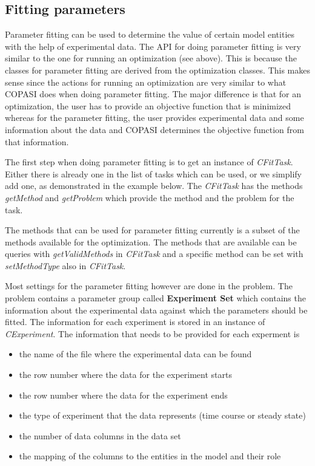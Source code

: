 \documentclass[a4,10pt]{article}
\begin{document}
\subsection{Fitting parameters}
\label{ParameterFitting}

Parameter fitting can be used to determine the value of certain model entities with the help of experimental data.
The API for doing parameter fitting is very similar to the one for running an optimization (see above). This is because the classes for parameter fitting are derived from the optimization classes.
This makes sense since the actions for running an optimization are very similar to what COPASI does when doing parameter fitting. The major difference is that for an optimization, the user has to provide an objective function that is minimized whereas for the parameter fitting, the user provides experimental data and some information about the data and COPASI determines the objective function from that information.

The first step when doing parameter fitting is to get an instance of \textit{CFitTask}. Either there is already one in the list of tasks which can be used, or we simplify add one, as demonstrated in the example below.
The \textit{CFitTask} has the methods \textit{getMethod} and \textit{getProblem} which provide the method and the problem for the task.

The methods that can be used for parameter fitting currently is a subset of the methods available for the optimization. The methods that are available can be queries with \textit{getValidMethods} in \textit{CFitTask} and a specific method can be set with \textit{setMethodType} also in \textit{CFitTask}.

Most settings for the parameter fitting however are done in the problem. The problem contains a parameter group called \textbf{Experiment Set} which contains the information about the experimental data against which the parameters should be fitted.
The information for each experiment is stored in an instance of \textit{CExperiment}. The information that needs to be provided for each experment is 
\begin{itemize}
\item{the name of the file where the experimental data can be found}
\item{the row number where the data for the experiment starts}
\item{the row number where the data for the experiment ends}
\item{the type of experiment that the data represents (time course or steady state)}
\item{the number of data columns in the data set}
\item{the mapping of the columns to the entities in the model and their role}
\end{itemize}
\end{document}
